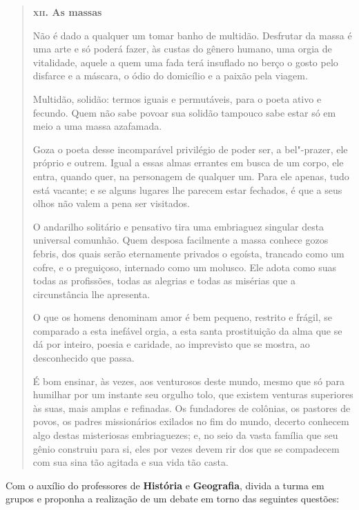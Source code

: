 \documentclass[12pt]{extarticle}
\begin{document}
\begin{quote}
\dotfill

\textbf{\textsc{xii.} As massas}\medskip

Não é dado a qualquer um tomar banho de multidão. Desfrutar da massa é uma
arte e só poderá fazer, às custas do gênero humano, uma orgia de
vitalidade, aquele a quem uma fada terá insuflado no berço o gosto
pelo disfarce e a máscara, o ódio do domicílio e a paixão pela
viagem.

Multidão, solidão: termos iguais e permutáveis, para o poeta ativo e
fecundo. Quem não sabe povoar sua solidão tampouco sabe estar só em
meio a uma massa azafamada.

Goza o poeta desse incomparável privilégio de poder ser, a bel"-prazer,
ele próprio e outrem. Igual a essas almas errantes em busca de um corpo,
ele entra, quando quer, na personagem de qualquer um. Para ele apenas, tudo
está vacante; e se alguns lugares lhe parecem estar fechados, é que a
seus olhos não valem a pena ser visitados.

O andarilho solitário e pensativo tira uma embriaguez singular desta
universal comunhão. Quem desposa facilmente a massa conhece gozos
febris, dos quais serão eternamente privados o egoísta, trancado como
um cofre, e o preguiçoso, internado como um molusco. Ele adota como
suas todas as profissões, todas as alegrias e todas as misérias que a
circunstância lhe apresenta.

O que os homens denominam amor é bem pequeno, restrito e frágil, se 
comparado a esta inefável orgia, a esta santa prostituição da alma
que se dá por inteiro, poesia e caridade, ao imprevisto que se mostra, ao
desconhecido que passa.

É bom ensinar, às vezes, aos venturosos deste mundo, mesmo que só para
humilhar por um instante seu orgulho tolo, que existem venturas
superiores às suas, mais amplas e refinadas. Os fundadores de colônias,
os pastores de povos, os padres missionários exilados no fim do mundo,
decerto conhecem algo destas misteriosas embriaguezes; e, no seio da
vasta família que seu gênio construiu para si, eles por vezes devem rir
dos que se compadecem com sua sina tão agitada e sua vida tão
casta.

\dotfill
\end{quote}

Com o auxílio do professores de \textbf{História} e \textbf{Geografia}, divida a turma em grupos e proponha a realização de um debate em torno das seguintes questões:
\end{document}

